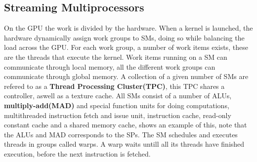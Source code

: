\subsection{Streaming Multiprocessors}
On the GPU the work is divided by the hardware.
When a kernel is launched, the hardware dynamically assign work groups to SMs, doing so while balancing the load across the GPU.
For each work group, a number of work items exists, these are the threads that execute the kernel.
Work items running on a SM can communicate through local memory, all the different work groups can communicate through global memory. %
A collection of a given number of SMs are refered to as a \textbf{Thread Processing Cluster(TPC)}, this TPC shares a controller, aswell as a texture cache.
All SMs consist of a number of ALUs, \textbf{multiply-add(MAD)} and special function units for doing computations, multithreaded instruction fetch and issue unit, instruction cache, read-only constant cache and a shared memory cache,  shows an example of this, note that the ALUs and MAD corresponds to the SPs.
The SM schedules and executes threads in groups called warps.
A warp waits untill all its threads have finished execution, before the next instruction is fetched. 
